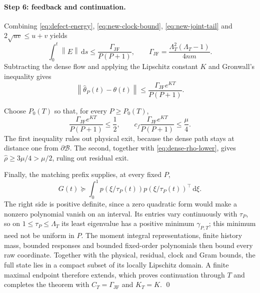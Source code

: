 \documentclass[11pt]{article}
\theoremstyle{definition}
\theoremstyle{remark}
\newcommand{\norm}[1]{\left\lVert #1\right\rVert}
\newcommand{\dd}{\,\mathrm{d}}
\begin{document}
\paragraph{Step 6: feedback and continuation.}
Combining \eqref{eq:defect-energy}, \eqref{eq:new-clock-bound},
\eqref{eq:new-joint-tail} and $2\sqrt{uv}\le u+v$ yields
\begin{equation}
 \int_0^t\norm E\dd s
 \le\frac{\Gamma_{\mathrm{JF}}}{P(P+1)},\qquad
 \Gamma_{\mathrm{JF}}=\frac{\Lambda_T^2(\Lambda_T-1)}{4nm}.     \label{eq:new-sharp-defect}
\end{equation}
Subtracting the dense flow and applying the Lipschitz constant $K$ and Gronwall's
inequality gives
\begin{equation}
 \norm{\widehat\theta_P(t)-\theta(t)}
 \le\frac{\Gamma_{\mathrm{JF}}e^{KT}}{P(P+1)}.                  \label{eq:new-feedback}
\end{equation}

Choose $P_0(T)$ so that, for every $P\ge P_0(T)$,
\begin{equation}
 \frac{\Gamma_{\mathrm{JF}}e^{KT}}{P(P+1)}\le\frac12,\qquad
 c_f\frac{\Gamma_{\mathrm{JF}}e^{KT}}{P(P+1)}\le\frac\mu4.      \label{eq:new-order-condition}
\end{equation}
The first inequality rules out physical exit, because the dense path stays at
distance one from $\partial\mathcal B$.  The second, together with
\eqref{eq:dense-rho-lower}, gives $\widehat\rho\ge3\mu/4>\mu/2$, ruling out
residual exit.

Finally, the matching prefix supplies, at every fixed $P$,
\begin{equation}
 G(t)\succeq\int_0^1p(\xi/\tau_P(t))p(\xi/\tau_P(t))^\top\dd\xi. \label{eq:prefix-gram}
\end{equation}
The right side is positive definite, since a zero quadratic form would make a
nonzero polynomial vanish on an interval.  Its entries vary continuously with
$\tau_P$, so on $1\le \tau_P\le\Lambda_T$ its least eigenvalue has a positive minimum
$\gamma_{P,T}$; this minimum need not be uniform in $P$.  The moment integral
representations, finite history mass, bounded responses and bounded
fixed-order polynomials then bound every raw coordinate.  Together with the
physical, residual, clock and Gram bounds, the full state lies in a compact
subset of its locally Lipschitz domain.  A finite maximal endpoint therefore
extends, which proves continuation through $T$ and completes the theorem with
$C_T=\Gamma_{\mathrm{JF}}$ and $K_T=K$. \qed
\end{document}
